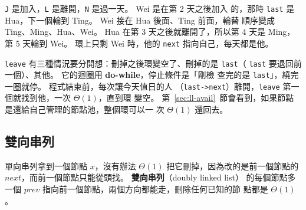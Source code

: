 
\texttt{J} 是加入，\texttt{L} 是離開，\texttt{N} 是過一天。 Wei 是在第 2 天之後加入
的，那時 \texttt{last} 是 Hua，下一個輪到 Ting。 Wei 接在 Hua 後面、Ting 前面，輪替
順序變成 Ting、Ming、Hua、Wei。 Hua 在第 3 天之後就離開了，所以第 4 天是 Ming，第 5
天輪到 Wei。 環上只剩 Wei 時，他的 \texttt{next} 指向自己，每天都是他。

\texttt{leave} 有三種情況要分開想：刪掉之後環變空了、刪掉的是 \texttt{last}（
\texttt{last} 要退回前一個）、其他。 它的迴圈用 \textbf{do-while}，停止條件是「剛檢
查完的是 \texttt{last}」，繞完一圈就停。 程式結束前，每次讓今天值日的人
（\texttt{last->next}）離開，\texttt{leave} 第一個就找到他，一次 $\Theta(1)$，直到環
變空。 第~\ref{sec:ll-avail}~節會看到，如果節點是還給自己管理的節點池，整個環可以一
次 $\Theta(1)$ 還回去。

\subsection{雙向串列}

單向串列拿到一個節點 $x$，沒有辦法 $\Theta(1)$ 把它刪掉，因為改的是前一個節點的
$\mathit{next}$，而前一個節點只能從頭找。 \textbf{雙向串列}（doubly linked list）
的每個節點多一個 $\mathit{prev}$ 指向前一個節點，兩個方向都能走，刪除任何已知的節
點都是 $\Theta(1)$。

